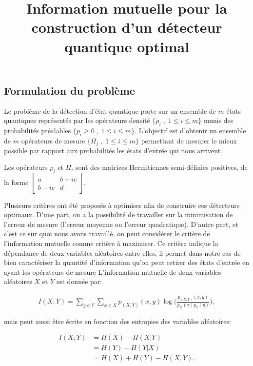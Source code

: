 \documentclass[12pt,a4paper]{article}
\title{Information mutuelle pour la construction d'un détecteur quantique optimal}
\date{}
\begin{document}
    \maketitle
    
    \subsection*{Formulation du problème}
    Le problème de la détection d'état quantique porte sur un ensemble de $m$ états quantiques représentés par les opérateurs densité $\{\rho_i \; , \; 1 \leq i \leq m\}$ munis des probabilités préalables $\{p_i \geq 0 \; , \; 1 \leq i \leq m \}$. L'objectif est d'obtenir un ensemble de $m$ opérateurs de mesure $\{\Pi_j \; , \; 1 \leq i \leq m\}$ permettant de mesurer le mieux possible par rapport aux probabilités les états d'entrée qui nous arrivent.

    Les opérateurs $\rho_i$ et $\Pi_i$ sont des matrices Hermitiennes semi-définies positives, de la forme $\begin{bmatrix}a & b+ic \\ b-ic & d \end{bmatrix}$.


    Plusieurs critères ont été proposés à optimiser afin de construire ces détecteurs optimaux. D'une part, on a la possibilité de travailler sur la minimisation de l'erreur de mesure (l'erreur moyenne ou l'erreur quadratique). D'autre part, et c'est ce sur quoi nous avons travaillé, on peut considérer le critère de l'information mutuelle comme critère à maximiser. Ce critère indique la dépendance de deux variables aléatoires entre elles, il permet dans notre cas de bien caractériser la quantité d'information qu'on peut retirer des états d'entrée en ayant les opérateurs de mesure
\medbreak
    L'information mutuelle de deux variables aléatoires $X$ et $Y$ est donnée par:

    \begin{align}
        I(X;Y) = \displaystyle \sum_{y \in Y} \displaystyle \sum_{x \in X} p_{(X, Y)}(x, y) \log \big(\frac{p_{(X, Y)}(x, y)}{p_X(x) p_Y(y)}\big),
    \end{align}

    mais peut aussi être écrite en fonction des entropies des variables aléatoires:

    \begin{align}
        I(X; Y) &= H(X) - H(X | Y) \\
                &= H(Y) - H(Y | X) \\
                &= H(X) + H(Y) - H(X, Y).
    \end{align}
\end{document}
